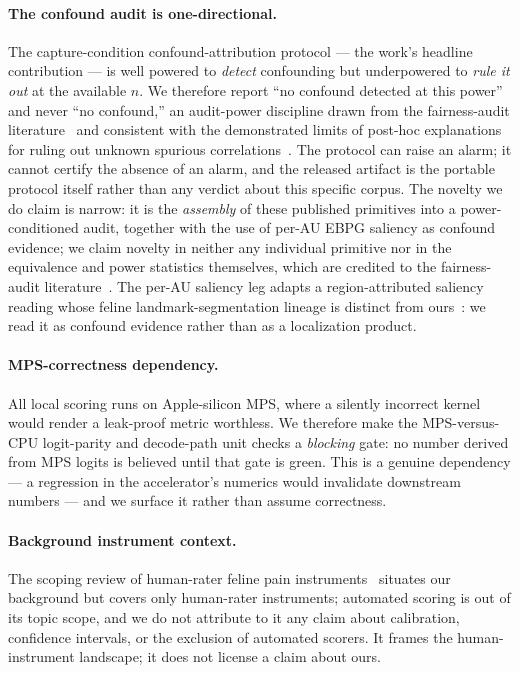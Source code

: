 \paragraph{The confound audit is one-directional.}
The capture-condition confound-attribution protocol --- the work's headline
contribution --- is well powered to \emph{detect} confounding but underpowered to
\emph{rule it out} at the available $n$. We therefore report ``no confound detected
at this power'' and never ``no confound,'' an audit-power discipline drawn from the
fairness-audit literature~\cite{huanghooker2026fairness,singh2023samplesize} and
consistent with the demonstrated limits of post-hoc explanations for ruling out
unknown spurious correlations~\cite{adebayo2022posthoc}. The protocol can raise an
alarm; it cannot certify the absence of an alarm, and the released artifact is the
portable protocol itself rather than any verdict about this specific corpus. The
novelty we do claim is narrow: it is the \emph{assembly} of these published
primitives into a power-conditioned audit, together with the use of per-AU EBPG
saliency as confound evidence; we claim novelty in neither any individual primitive
nor in the equivalence and power statistics themselves, which are credited to the
fairness-audit literature~\cite{huanghooker2026fairness,singh2023samplesize}. The
per-AU saliency leg adapts a region-attributed saliency reading whose feline
landmark-segmentation lineage is distinct from ours~\cite{lencioni2025segment}: we
read it as confound evidence rather than as a localization product.

\paragraph{MPS-correctness dependency.}
All local scoring runs on Apple-silicon MPS, where a silently incorrect kernel
would render a leak-proof metric worthless. We therefore make the MPS-versus-CPU
logit-parity and decode-path unit checks a \emph{blocking} gate: no number
derived from MPS logits is believed until that gate is green. This is a genuine
dependency --- a regression in the accelerator's numerics would invalidate
downstream numbers --- and we surface it rather than assume correctness.

\paragraph{Background instrument context.}
The scoping review of human-rater feline pain instruments~\cite{leesteagall2026}
situates our background but covers only human-rater instruments; automated
scoring is out of its topic scope, and we do not attribute to it any claim about
calibration, confidence intervals, or the exclusion of automated scorers. It
frames the human-instrument landscape; it does not license a claim about ours.


